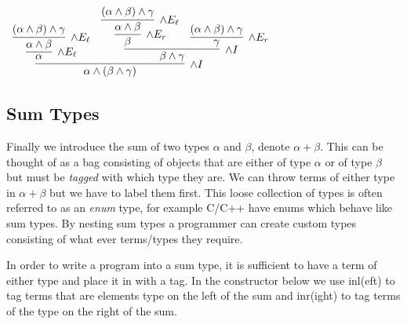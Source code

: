 \documentclass{book}
\begin{document}
\begin{eg}
            \begin{mdframed}
                \begin{center}
                    $\begin{array}{c}
                        \infer[\land I]{\alpha \land (\beta \land \gamma)}
                            {\infer[\land E_{\ell}]{\alpha}
                                {\infer[\land E_{\ell}]{\alpha \land \beta}
                                {(\alpha \land \beta) \land \gamma}}
                                &
                                \infer[\land I]{\beta \land \gamma}
                                    {\infer[\land E_{r}]{\beta} 
                                        {\infer[\land E_{\ell}]{\alpha \land \beta}
                                            {(\alpha \land \beta) \land \gamma}}
                            &
                            \infer[\land E_{r}]{\gamma} 
                            {(\alpha \land \beta) \land \gamma}}}
                    \end{array}$
                \end{center}
            \end{mdframed}
    
        \end{eg}

        \begin{eg} [Currying]


        \end{eg}


    \newpage
    \subsection*{Sum Types}

    Finally we introduce the sum of two types $\alpha$ and $\beta$, denote $\alpha + \beta$. This can be thought of as a bag consisting of objects that are either of type $\alpha$ or of type $\beta$ but must be \emph{tagged} with which type they are. We can throw terms of either type in $\alpha + \beta$ but we have to label them first. This loose collection of types is often referred to as an \emph{enum} type, for example C/C++ have enums which behave like sum types. By nesting sum types a programmer can create custom types consisting of what ever terms/types they require. 

    In order to write a program into a sum type, it is sufficient to have a term of either type and place it in with a tag. In the constructor below we use inl(eft) to tag terms that are elements type on the left of the sum and inr(ight) to tag terms of the type on the right of the sum. 
\end{document}
